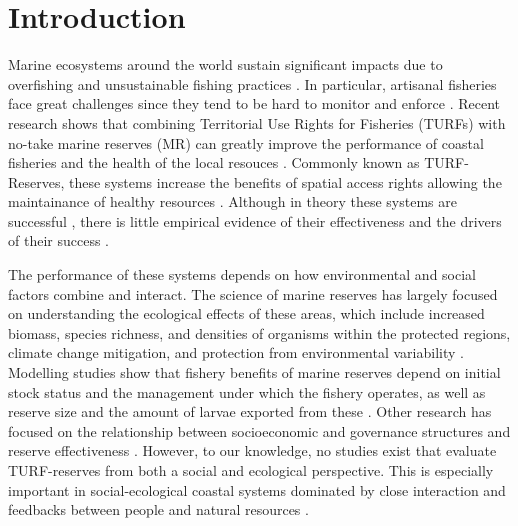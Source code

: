 \documentclass{frontiersSCNS}
\theoremstyle{definition}
\theoremstyle{definition}
\theoremstyle{definition}
\theoremstyle{remark}
\begin{document}
\clearpage

\section{Introduction}\label{introduction}

Marine ecosystems around the world sustain significant impacts due to
overfishing and unsustainable fishing practices
\citep{halpern_2008-dK,worm_2006-IB,pauly_2005-qV}. In particular,
artisanal fisheries face great challenges since they tend to be hard to
monitor and enforce \citep{costello_2012}. Recent research shows that
combining Territorial Use Rights for Fisheries (TURFs) with no-take
marine reserves (MR) can greatly improve the performance of coastal
fisheries and the health of the local resouces
\citep{costello_2010-Ix,lester_2017}. Commonly known as TURF-Reserves,
these systems increase the benefits of spatial access rights allowing
the maintainance of healthy resources
\citep{afflerbach_2014-HP,lester_2017}. Although in theory these systems
are successful \citep{costello_2010-Ix}, there is little empirical
evidence of their effectiveness and the drivers of their success
\citep{afflerbach_2014-HP,lester_2017,smallhornwest_2018}.

The performance of these systems depends on how environmental and social
factors combine and interact. The science of marine reserves has largely
focused on understanding the ecological effects of these areas, which
include increased biomass, species richness, and densities of organisms
within the protected regions, climate change mitigation, and protection
from environmental variability
\citep{lester_2009-Ks,giakoumi_2017-V2,sala_2017-69,roberts_2017-J9,micheli_2012-EU}.
Modelling studies show that fishery benefits of marine reserves depend
on initial stock status and the management under which the fishery
operates, as well as reserve size and the amount of larvae exported from
these \citep{hilborn_2006,krueck_2017-J1,deleo_2015}. Other research has
focused on the relationship between socioeconomic and governance
structures and reserve effectiveness
\citep{halpern_2013,lpezangarita_2014,mascia_2017-m_}. However, to our
knowledge, no studies exist that evaluate TURF-reserves from both a
social and ecological perspective. This is especially important in
social-ecological coastal systems dominated by close interaction and
feedbacks between people and natural resources \citep{ostrom_2009-hg}.
\end{document}
